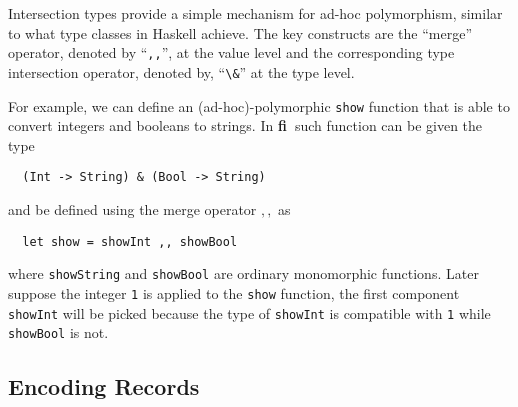 \documentclass[preprint]{sigplanconf}
\newcommand{\systemfi}{{\bf fi~}}
\begin{document}
Intersection types provide a simple mechanism for ad-hoc polymorphism, similar
to what type classes in Haskell achieve. The key constructs are the ``merge''
operator, denoted by ``\lstinline{,,}'', at the value level and the corresponding type
intersection operator, denoted by, ``\lstinline{\&}'' at the type level.

For example, we can define an (ad-hoc)-polymorphic \lstinline{show} function
that is able to convert integers and booleans to strings. In \systemfi such function
can be given the type
\begin{lstlisting}
  (Int -> String) & (Bool -> String)
\end{lstlisting}
and be defined using the merge operator $ ,, $ as
\begin{lstlisting}
  let show = showInt ,, showBool
\end{lstlisting}
where \lstinline{showString} and \lstinline{showBool} are ordinary monomorphic
functions. Later suppose the integer \lstinline{1} is applied to the \lstinline{show} function,
the first component \lstinline{showInt} will be picked because the type of \lstinline{showInt}
is compatible with \lstinline{1} while \lstinline{showBool} is not.








\subsection{Encoding Records}
\end{document}
